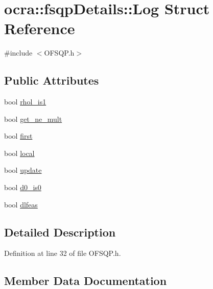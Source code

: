 \hypertarget{structocra_1_1fsqpDetails_1_1Log}{}\section{ocra\+:\+:fsqp\+Details\+:\+:Log Struct Reference}
\label{structocra_1_1fsqpDetails_1_1Log}


{\ttfamily \#include $<$O\+F\+S\+Q\+P.\+h$>$}

\subsection*{Public Attributes}
\begin{DoxyCompactItemize}
\item 
bool \hyperlink{structocra_1_1fsqpDetails_1_1Log_a9538a5454c767ecb63620f4b36d72676}{rhol\+\_\+is1}
\item 
bool \hyperlink{structocra_1_1fsqpDetails_1_1Log_aadc61b25f57b2277b7431ecedc29c6b4}{get\+\_\+ne\+\_\+mult}
\item 
bool \hyperlink{structocra_1_1fsqpDetails_1_1Log_add5ea7abffed65d8e168c8f47317c9bc}{first}
\item 
bool \hyperlink{structocra_1_1fsqpDetails_1_1Log_a17e784308319e498ceaf11b4b809df52}{local}
\item 
bool \hyperlink{structocra_1_1fsqpDetails_1_1Log_abb57457b6ee98f85e51eff3b56797668}{update}
\item 
bool \hyperlink{structocra_1_1fsqpDetails_1_1Log_a66091f6ab3b26727a8bb20be11997af7}{d0\+\_\+is0}
\item 
bool \hyperlink{structocra_1_1fsqpDetails_1_1Log_ab99dfa8d9e4586ab424df50710ae3961}{dlfeas}
\end{DoxyCompactItemize}


\subsection{Detailed Description}


Definition at line 32 of file O\+F\+S\+Q\+P.\+h.



\subsection{Member Data Documentation}
